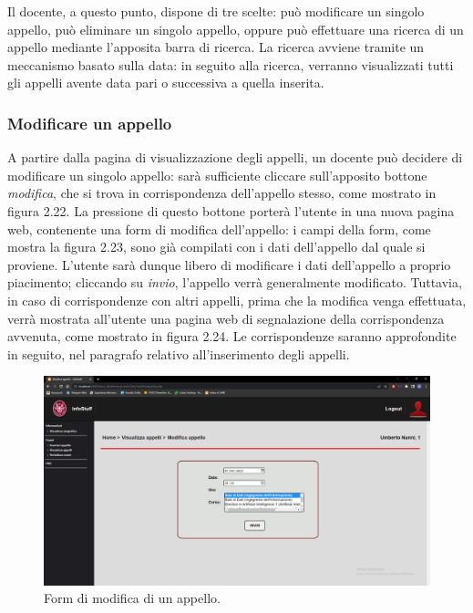 \documentclass [a4paper,11pt]{book}
\begin{document}
Il docente, a questo punto, dispone di tre scelte: può modificare un singolo appello, può eliminare un singolo appello, oppure può effettuare una ricerca di un appello mediante l'apposita barra di ricerca. La ricerca avviene tramite un meccanismo basato sulla data: in seguito alla ricerca, verranno visualizzati tutti gli appelli avente data pari o successiva a quella inserita.

\medskip

\subsubsection{Modificare un appello}

A partire dalla pagina di visualizzazione degli appelli, un docente può decidere di modificare un singolo appello: sarà sufficiente cliccare sull'apposito bottone \emph{modifica}, che si trova in corrispondenza dell'appello stesso, come mostrato in figura 2.22. La pressione di questo bottone porterà l'utente in una nuova pagina web, contenente una form di modifica dell'appello: i campi della form, come mostra la figura 2.23, sono già compilati con i dati dell'appello dal quale si proviene. L'utente sarà dunque libero di modificare i dati dell'appello a proprio piacimento; cliccando su \emph{invio}, l'appello verrà generalmente modificato. Tuttavia, in caso di corrispondenze con altri appelli, prima che la modifica venga effettuata, verrà mostrata all'utente una pagina web di segnalazione della corrispondenza avvenuta, come mostrato in figura 2.24. Le corrispondenze saranno approfondite in seguito, nel paragrafo relativo all'inserimento degli appelli.

\begin{figure}
\centering
\includegraphics[scale=0.3]{figura2-23.png}
\caption{Form di modifica di un appello.}
\end{figure}
\end{document}
